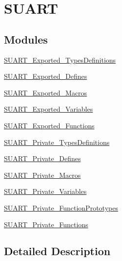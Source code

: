 \hypertarget{group___s_u_a_r_t}{}\section{S\+U\+A\+RT}
\label{group___s_u_a_r_t}
\subsection*{Modules}
\begin{DoxyCompactItemize}
\item 
\mbox{\hyperlink{group___s_u_a_r_t___exported___types_definitions}{S\+U\+A\+R\+T\+\_\+\+Exported\+\_\+\+Types\+Definitions}}
\item 
\mbox{\hyperlink{group___s_u_a_r_t___exported___defines}{S\+U\+A\+R\+T\+\_\+\+Exported\+\_\+\+Defines}}
\item 
\mbox{\hyperlink{group___s_u_a_r_t___exported___macros}{S\+U\+A\+R\+T\+\_\+\+Exported\+\_\+\+Macros}}
\item 
\mbox{\hyperlink{group___s_u_a_r_t___exported___variables}{S\+U\+A\+R\+T\+\_\+\+Exported\+\_\+\+Variables}}
\item 
\mbox{\hyperlink{group___s_u_a_r_t___exported___functions}{S\+U\+A\+R\+T\+\_\+\+Exported\+\_\+\+Functions}}
\item 
\mbox{\hyperlink{group___s_u_a_r_t___private___types_definitions}{S\+U\+A\+R\+T\+\_\+\+Private\+\_\+\+Types\+Definitions}}
\item 
\mbox{\hyperlink{group___s_u_a_r_t___private___defines}{S\+U\+A\+R\+T\+\_\+\+Private\+\_\+\+Defines}}
\item 
\mbox{\hyperlink{group___s_u_a_r_t___private___macros}{S\+U\+A\+R\+T\+\_\+\+Private\+\_\+\+Macros}}
\item 
\mbox{\hyperlink{group___s_u_a_r_t___private___variables}{S\+U\+A\+R\+T\+\_\+\+Private\+\_\+\+Variables}}
\item 
\mbox{\hyperlink{group___s_u_a_r_t___private___function_prototypes}{S\+U\+A\+R\+T\+\_\+\+Private\+\_\+\+Function\+Prototypes}}
\item 
\mbox{\hyperlink{group___s_u_a_r_t___private___functions}{S\+U\+A\+R\+T\+\_\+\+Private\+\_\+\+Functions}}
\end{DoxyCompactItemize}


\subsection{Detailed Description}
